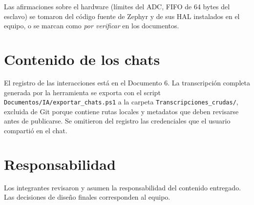 \documentclass[12pt,a4paper]{article}
\begin{document}
Las afirmaciones sobre el hardware (límites del ADC, FIFO de 64 bytes del esclavo) se tomaron del código fuente de Zephyr y de sus HAL instalados en el equipo, o se marcan como \emph{por verificar} en los documentos.

\section{Contenido de los chats}

El registro de las interacciones está en el Documento 6. La transcripción completa generada por la herramienta se exporta con el script \texttt{Documentos/IA/exportar\_chats.ps1} a la carpeta \texttt{Transcripciones\_crudas/}, excluida de Git porque contiene rutas locales y metadatos que deben revisarse antes de publicarse. Se omitieron del registro las credenciales que el usuario compartió en el chat.

\section{Responsabilidad}

Los integrantes revisaron y asumen la responsabilidad del contenido entregado. Las decisiones de diseño finales corresponden al equipo.
\end{document}
